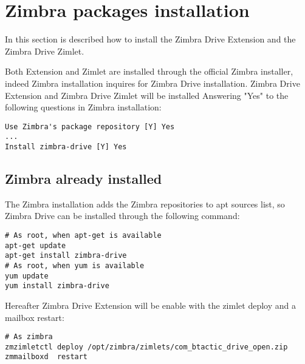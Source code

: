 \section{Zimbra packages installation}

In this section is described how to install the Zimbra Drive Extension and the Zimbra Drive Zimlet.

Both Extension and Zimlet are installed through the official Zimbra installer,
indeed Zimbra installation inquires for Zimbra Drive installation.
Zimbra Drive Extension and Zimbra Drive Zimlet will be installed Answering
"Yes" to the following questions in Zimbra installation:

\begin{verbatim}
Use Zimbra's package repository [Y] Yes
...
Install zimbra-drive [Y] Yes
\end{verbatim}

\subsection{Zimbra already installed}

The Zimbra installation adds the Zimbra repositories to apt sources list,
so Zimbra Drive can be installed through the following command:

\begin{verbatim}
# As root, when apt-get is available
apt-get update
apt-get install zimbra-drive
# As root, when yum is available
yum update
yum install zimbra-drive
\end{verbatim}

Hereafter Zimbra Drive Extension will be enable with the zimlet deploy and a mailbox restart:

\begin{verbatim}
# As zimbra
zmzimletctl deploy /opt/zimbra/zimlets/com_btactic_drive_open.zip
zmmailboxd  restart
\end{verbatim}
